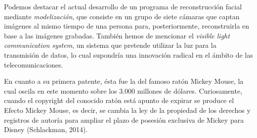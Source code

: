 Podemos destacar el actual desarrollo de un programa de reconstrucción facial mediante \textit{modelización}, que consiste en un grupo de siete cámaras que captan imágenes al mismo tiempo de una persona para, posteriormente, reconstruirla en base a las imágenes grabadas. También hemos de mencionar el \textit{visible light communication system}, un sistema que pretende utilizar la luz para la transmisión de datos, lo cual supondría una innovación radical en el ámbito de las telecomunicaciones.

En cuanto a su primera patente, ésta fue la del famoso ratón Mickey Mouse, la cual oscila en este momento sobre los 3.000 millones de dólares. Curiosamente, cuando el copyright del conocido ratón está apunto de expirar se produce el Efecto Mickey Mouse, es decir, se cambia la ley de la propiedad de los derechos y registros de autoría para ampliar el plazo de posesión exclusiva de Mickey para Disney (Schlackman, 2014).


